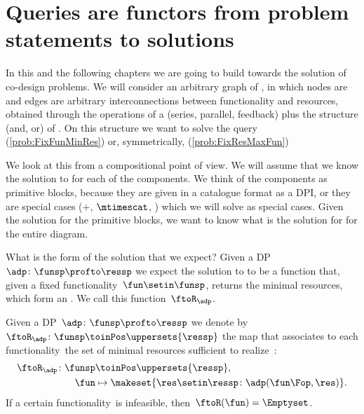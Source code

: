 \section{Queries are functors from problem statements to solutions}

In this and the following chapters we are going to build towards the solution of co-design problems.
We will consider an arbitrary graph of , in which nodes are  and edges are arbitrary interconnections between functionality and resources, obtained through the operations of a  (series, parallel, feedback) plus the  structure (and, or) of .
On this structure we want to solve the query \FixFunMinRes (\cref{prob:FixFunMinRes}) or, symmetrically, \FixResMaxFun (\cref{prob:FixResMaxFun})

We look at this from a compositional point of view.
We will assume that we know the solution to \FixFunMinRes for each of the components.
We think of the components as primitive blocks, because they are given in a catalogue format as a DPI, or they are special cases ($+$, $\mtimescat$, \etc) which we will solve as special cases.
Given the solution for the primitive blocks, we want to know what is the solution for \FixFunMinRes for the entire diagram.

What is the form of the solution that we expect?
Given a DP~$\adp\colon \funsp \profto \ressp$ we expect the solution to \FixFunMinRes to be a function that, given a fixed functionality~$\fun\setin\funsp$, returns the minimal resources, which form an .
We call this function~$\ftoR_\adp$.

\begin{definition}
    \label{def:ftoR-dp}
    Given a DP~$\adp\colon\funsp\profto\ressp$ we denote by~$\ftoR_{\adp}\colon \funsp\toinPos \uppersets{\ressp}$ the map that associates to each functionality~\fun the set of minimal resources sufficient to realize~\fun:
    \begin{equation}
        \begin{aligned}
            \ftoR_{\adp}\colon \funsp & \toinPos \uppersets{\ressp}, \\
            \fun                      & \mapsto \makeset{ \res \setin \ressp \colon \adp(\fun\Fop, \res)}.
        \end{aligned}
    \end{equation}
    If a certain functionality~\fun is infeasible, then~$\ftoR(\fun)=\Emptyset$.
\end{definition}

